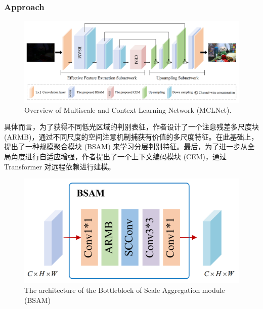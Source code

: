 \documentclass[a4paper, 10pt]{article}
\begin{document}
			\subsubsection{Approach}
			
			\begin{figure}[htbp]
				\centering 
				\includegraphics[width=\columnwidth]{picture/LLIE/MCLNet/Overview}
				\caption{
					\label{fig: MCLNet Overview} 
					Overview of Multiscale and Context Learning Network (MCLNet).
				}
			\end{figure}
			
			具体而言，为了获得不同低光区域的判别表征，作者设计了一个注意残差多尺度块 (ARMB)，通过不同尺度的空间注意机制捕获有价值的多尺度特征。在此基础上，提出了一种规模聚合模块 (BSAM) 来学习分层判别特征。最后，为了进一步从全局角度进行自适应增强，作者提出了一个上下文编码模块 (CEM)，通过 Transformer 对远程依赖进行建模。
			
			\begin{figure}[htbp]
				\centering 
				\includegraphics[width=0.7\columnwidth]{picture/LLIE/MCLNet/BSAM}
				\caption{
					\label{fig: MCLNet BSAM} 
					The architecture of the Bottleblock of Scale Aggregation module (BSAM)
				}
			\end{figure}
			
\end{document}
